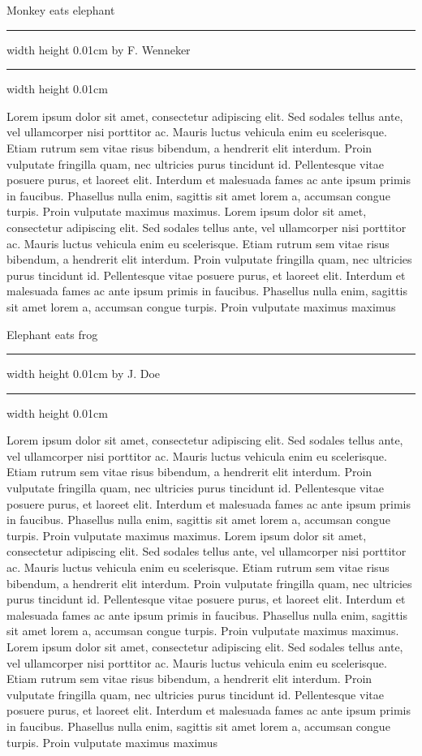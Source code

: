 \documentclass[10pt,a4paper]{article}
\newcommand{\NewsItem}[1]{\Large #1}
\newcommand{\NewsAuthor}[1]{\small by {#1}}
\newcommand{\ItemWrapper}[2]{
	\begin{center}
	\NewsItem{#1}
	\vspace{0.15cm}
	\noindent\hrule width \linewidth height 0.01cm
	\vspace{0.15cm}
	\NewsAuthor{#2}
	\vspace{0.1cm}
	\noindent\hrule width \linewidth height 0.01cm
	\end{center}
}
\begin{document}
\begin{multicols}{3}
\ItemWrapper{Monkey eats elephant}{F. Wenneker}

Lorem ipsum dolor sit amet, consectetur adipiscing elit. Sed sodales tellus ante, vel ullamcorper nisi porttitor ac. Mauris luctus vehicula enim eu scelerisque. Etiam rutrum sem vitae risus bibendum, a hendrerit elit interdum. Proin vulputate fringilla quam, nec ultricies purus tincidunt id. Pellentesque vitae posuere purus, et laoreet elit. Interdum et malesuada fames ac ante ipsum primis in faucibus. Phasellus nulla enim, sagittis sit amet lorem a, accumsan congue turpis. Proin vulputate maximus maximus. Lorem ipsum dolor sit amet, consectetur adipiscing elit. Sed sodales tellus ante, vel ullamcorper nisi porttitor ac. Mauris luctus vehicula enim eu scelerisque. Etiam rutrum sem vitae risus bibendum, a hendrerit elit interdum. Proin vulputate fringilla quam, nec ultricies purus tincidunt id. Pellentesque vitae posuere purus, et laoreet elit. Interdum et malesuada fames ac ante ipsum primis in faucibus. Phasellus nulla enim, sagittis sit amet lorem a, accumsan congue turpis. Proin vulputate maximus maximus

\ItemWrapper{Elephant eats frog}{J. Doe}

Lorem ipsum dolor sit amet, consectetur adipiscing elit. Sed sodales tellus ante, vel ullamcorper nisi porttitor ac. Mauris luctus vehicula enim eu scelerisque. Etiam rutrum sem vitae risus bibendum, a hendrerit elit interdum. Proin vulputate fringilla quam, nec ultricies purus tincidunt id. Pellentesque vitae posuere purus, et laoreet elit. Interdum et malesuada fames ac ante ipsum primis in faucibus. Phasellus nulla enim, sagittis sit amet lorem a, accumsan congue turpis. Proin vulputate maximus maximus. Lorem ipsum dolor sit amet, consectetur adipiscing elit. Sed sodales tellus ante, vel ullamcorper nisi porttitor ac. Mauris luctus vehicula enim eu scelerisque. Etiam rutrum sem vitae risus bibendum, a hendrerit elit interdum. Proin vulputate fringilla quam, nec ultricies purus tincidunt id. Pellentesque vitae posuere purus, et laoreet elit. Interdum et malesuada fames ac ante ipsum primis in faucibus. Phasellus nulla enim, sagittis sit amet lorem a, accumsan congue turpis. Proin vulputate maximus maximus. Lorem ipsum dolor sit amet, consectetur adipiscing elit. Sed sodales tellus ante, vel ullamcorper nisi porttitor ac. Mauris luctus vehicula enim eu scelerisque. Etiam rutrum sem vitae risus bibendum, a hendrerit elit interdum. Proin vulputate fringilla quam, nec ultricies purus tincidunt id. Pellentesque vitae posuere purus, et laoreet elit. Interdum et malesuada fames ac ante ipsum primis in faucibus. Phasellus nulla enim, sagittis sit amet lorem a, accumsan congue turpis. Proin vulputate maximus maximus
\end{multicols}
\end{document}
